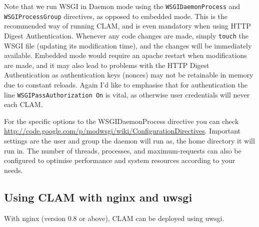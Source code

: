 \documentclass[a4paper,12pt,twoside,openright]{report}
\begin{document}
Note that we run WSGI in Daemon mode using the \texttt{WSGIDaemonProcess} and
\texttt{WSGIProcessGroup} directives, as opposed to embedded mode. This is the
recommended way of running CLAM, and is even mandatory when using HTTP Digest
Authentication. Whenever any code changes are made, simply
\texttt{touch} the WSGI file (updating its modification time), and the changes
will be immediately available. Embedded mode would require an apache restart
when modifications are made, and it may also lead to problems with the HTTP
Digest Authentication as authentication keys (nonces) may not be retainable in
memory due to constant reloads.  Again I'd like to emphasise that for
authentication the line \texttt{WSGIPassAuthorization On} is vital, as
otherwise user credentials will never each CLAM.

For the specific options to the WSGIDaemonProcess directive you can check
\url{http://code.google.com/p/modwsgi/wiki/ConfigurationDirectives}.
Important settings are the user and group the daemon will run as, the home
directory it will run in. The number of threads, processes, and
maximum-requests can also be configured to optimise performance and system
resources according to your needs.

\subsection{Using CLAM with nginx and uwsgi}

With nginx (version 0.8 or above), CLAM can be deployed using uwsgi.
\end{document}
